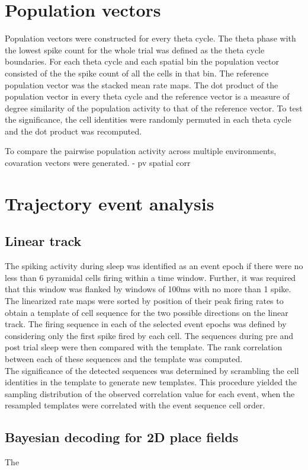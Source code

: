 \section{Population vectors}
Population vectors were constructed for every theta cycle. The theta phase with the lowest spike count for the whole trial was defined as the theta cycle boundaries. For each theta cycle and each spatial bin the population vector consisted of the the spike count of all the cells in that bin. The reference population vector was the stacked mean rate maps. The dot product of the population vector in every theta cycle and the reference vector is a measure of degree similarity of the population activity to that of the reference vector. To test the significance, the cell identities were randomly permuted in each theta cycle and the dot product was recomputed. 

To compare the pairwise population activity across multiple environments, covaration vectors were generated. 
\cite{Gothard1996} - pv spatial corr 

\section{Trajectory event analysis}
\subsection{Linear track}
The spiking activity during sleep was identified as an event epoch if there were no less than 6 pyramidal cells firing within a time window. Further, it was required that this window was flanked by windows of 100ms with no more than 1 spike. The linearized rate maps were sorted by position of their peak firing rates to obtain a template of cell sequence for the two possible directions on the linear track. The firing sequence in each of the selected event epochs was defined by considering only the first spike fired by each cell. The sequences during pre and post trial sleep were then compared with the template. The rank correlation between each of these sequences and the template was computed. \\ 
The significance of the detected sequences was determined by scrambling the cell identities in the template to generate new templates. This procedure yielded the sampling distribution of the observed correlation value for each event, when the resampled templates were correlated with the event sequence cell order. \\



\subsection{Bayesian decoding for 2D place fields}
The 
	
